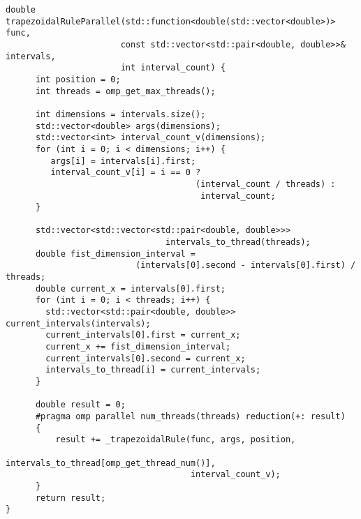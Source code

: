 \documentclass{report}
\begin{document}
\begin{lstlisting}
double trapezoidalRuleParallel(std::function<double(std::vector<double>)> func,
                       const std::vector<std::pair<double, double>>& intervals,
                       int interval_count) {
      int position = 0;
      int threads = omp_get_max_threads();

      int dimensions = intervals.size();
      std::vector<double> args(dimensions);
      std::vector<int> interval_count_v(dimensions);
      for (int i = 0; i < dimensions; i++) {
         args[i] = intervals[i].first;
         interval_count_v[i] = i == 0 ?
                                      (interval_count / threads) :
                                       interval_count;
      }

      std::vector<std::vector<std::pair<double, double>>>
                                intervals_to_thread(threads);
      double fist_dimension_interval =
                          (intervals[0].second - intervals[0].first) / threads;
      double current_x = intervals[0].first;
      for (int i = 0; i < threads; i++) {
        std::vector<std::pair<double, double>> current_intervals(intervals);
        current_intervals[0].first = current_x;
        current_x += fist_dimension_interval;
        current_intervals[0].second = current_x;
        intervals_to_thread[i] = current_intervals;
      }

      double result = 0;
      #pragma omp parallel num_threads(threads) reduction(+: result)
      {
          result += _trapezoidalRule(func, args, position,
                                     intervals_to_thread[omp_get_thread_num()],
                                     interval_count_v);
      }
      return result;
}
\end{lstlisting}
\end{document}
